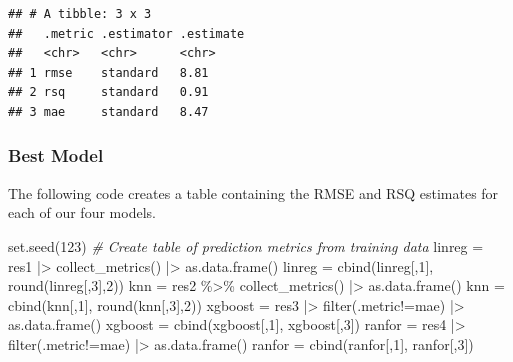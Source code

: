 \documentclass[
]{article}
\newenvironment{Shaded}{\begin{snugshade}}{\end{snugshade}}
\newcommand{\CommentTok}[1]{\textcolor[rgb]{0.56,0.35,0.01}{\textit{#1}}}
\newcommand{\DecValTok}[1]{\textcolor[rgb]{0.00,0.00,0.81}{#1}}
\newcommand{\FunctionTok}[1]{\textcolor[rgb]{0.00,0.00,0.00}{#1}}
\newcommand{\NormalTok}[1]{#1}
\newcommand{\OtherTok}[1]{\textcolor[rgb]{0.56,0.35,0.01}{#1}}
\newcommand{\SpecialCharTok}[1]{\textcolor[rgb]{0.00,0.00,0.00}{#1}}
\newcommand{\StringTok}[1]{\textcolor[rgb]{0.31,0.60,0.02}{#1}}
\begin{document}
\begin{verbatim}
## # A tibble: 3 x 3
##   .metric .estimator .estimate
##   <chr>   <chr>      <chr>    
## 1 rmse    standard   8.81     
## 2 rsq     standard   0.91     
## 3 mae     standard   8.47
\end{verbatim}

\hypertarget{best-model}{%
\subsubsection{Best Model}\label{best-model}}

The following code creates a table containing the RMSE and RSQ estimates
for each of our four models.

\begin{Shaded}
\begin{Highlighting}[]
\FunctionTok{set.seed}\NormalTok{(}\DecValTok{123}\NormalTok{)}
\CommentTok{\# Create table of prediction metrics from training data}
\NormalTok{linreg }\OtherTok{=}\NormalTok{ res1 }\SpecialCharTok{|\textgreater{}} \FunctionTok{collect\_metrics}\NormalTok{() }\SpecialCharTok{|\textgreater{}} \FunctionTok{as.data.frame}\NormalTok{()}
\NormalTok{linreg }\OtherTok{=} \FunctionTok{cbind}\NormalTok{(linreg[,}\DecValTok{1}\NormalTok{], }\FunctionTok{round}\NormalTok{(linreg[,}\DecValTok{3}\NormalTok{],}\DecValTok{2}\NormalTok{))}
\NormalTok{knn }\OtherTok{=}\NormalTok{ res2 }\SpecialCharTok{\%\textgreater{}\%} \FunctionTok{collect\_metrics}\NormalTok{() }\SpecialCharTok{|\textgreater{}} \FunctionTok{as.data.frame}\NormalTok{()}
\NormalTok{knn }\OtherTok{=} \FunctionTok{cbind}\NormalTok{(knn[,}\DecValTok{1}\NormalTok{], }\FunctionTok{round}\NormalTok{(knn[,}\DecValTok{3}\NormalTok{],}\DecValTok{2}\NormalTok{))}
\NormalTok{xgboost }\OtherTok{=}\NormalTok{ res3 }\SpecialCharTok{|\textgreater{}} \FunctionTok{filter}\NormalTok{(.metric}\SpecialCharTok{!=}\StringTok{\textquotesingle{}mae\textquotesingle{}}\NormalTok{) }\SpecialCharTok{|\textgreater{}} \FunctionTok{as.data.frame}\NormalTok{()}
\NormalTok{xgboost }\OtherTok{=} \FunctionTok{cbind}\NormalTok{(xgboost[,}\DecValTok{1}\NormalTok{], xgboost[,}\DecValTok{3}\NormalTok{])}
\NormalTok{ranfor }\OtherTok{=}\NormalTok{ res4 }\SpecialCharTok{|\textgreater{}} \FunctionTok{filter}\NormalTok{(.metric}\SpecialCharTok{!=}\StringTok{\textquotesingle{}mae\textquotesingle{}}\NormalTok{) }\SpecialCharTok{|\textgreater{}} \FunctionTok{as.data.frame}\NormalTok{()}
\NormalTok{ranfor }\OtherTok{=} \FunctionTok{cbind}\NormalTok{(ranfor[,}\DecValTok{1}\NormalTok{], ranfor[,}\DecValTok{3}\NormalTok{])}


\end{Highlighting}
\end{Shaded}
\end{document}
